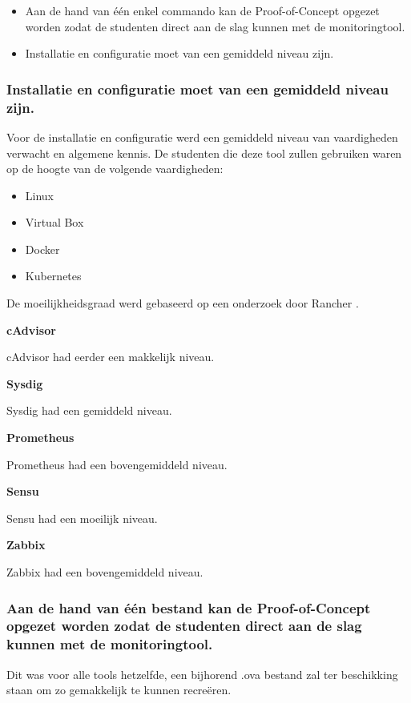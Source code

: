 \begin{itemize}
    \item Aan de hand van één enkel commando kan de Proof-of-Concept opgezet worden zodat de studenten direct aan de slag kunnen met de monitoringtool.
    \item Installatie en configuratie moet van een gemiddeld niveau zijn.
\end{itemize}

\subsubsection{Installatie en configuratie moet van een gemiddeld niveau zijn.}

Voor de installatie en configuratie werd een gemiddeld niveau van vaardigheden verwacht en algemene kennis. De studenten die deze tool zullen gebruiken waren op de hoogte van de volgende vaardigheden:

\begin{itemize}
    \item Linux
    \item Virtual Box
    \item Docker
    \item Kubernetes
\end{itemize}

De moeilijkheidsgraad werd gebaseerd op een onderzoek door Rancher \autocite{Sissons2021}. 

\textbf{cAdvisor}

cAdvisor had eerder een makkelijk niveau.

\textbf{Sysdig}

Sysdig had een gemiddeld niveau.

\textbf{Prometheus}

Prometheus had een bovengemiddeld niveau.

\textbf{Sensu}

Sensu had een moeilijk niveau.

\textbf{Zabbix}

Zabbix had een bovengemiddeld niveau.

\subsubsection{Aan de hand van één bestand kan de Proof-of-Concept opgezet worden zodat de studenten direct aan de slag kunnen met de monitoringtool.}

Dit was voor alle tools hetzelfde, een bijhorend .ova bestand zal ter beschikking staan om zo gemakkelijk te kunnen recreëren.

